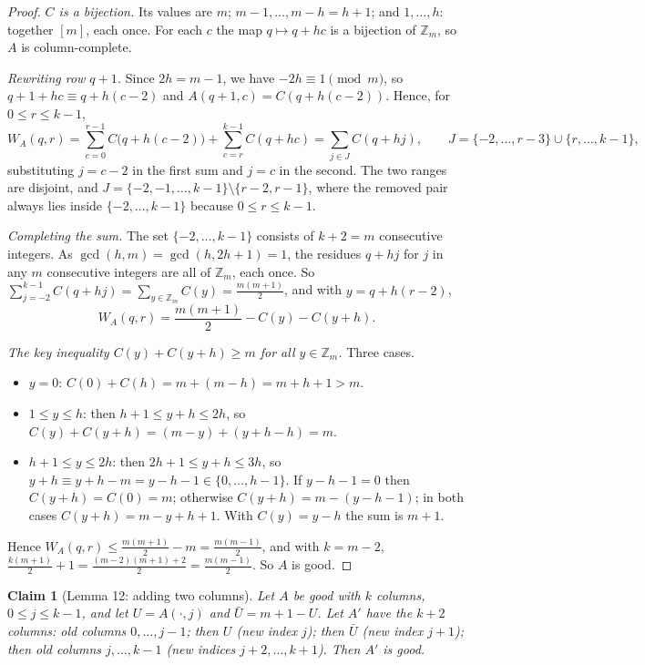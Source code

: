 \documentclass[11pt]{amsart}
\newtheorem{claim}{Claim}
\theoremstyle{remark}
\newcommand{\Z}{\mathbb{Z}}
\begin{document}
\begin{proof}
\emph{$C$ is a bijection.} Its values are $m$; $m-1,\dots,m-h=h+1$; and $1,\dots,h$: together $[m]$, each once.
For each $c$ the map $q\mapsto q+hc$ is a bijection of $\Z_m$, so $A$ is column-complete.

\emph{Rewriting row $q+1$.} Since $2h=m-1$, we have $-2h\equiv1\pmod m$, so $q+1+hc\equiv q+h(c-2)$ and
$A(q+1,c)=C(q+h(c-2))$. Hence, for $0\le r\le k-1$,
\[
W_A(q,r)=\sum_{c=0}^{r-1}C\bigl(q+h(c-2)\bigr)+\sum_{c=r}^{k-1}C(q+hc)=\sum_{j\in J}C(q+hj),\qquad
J=\{-2,\dots,r-3\}\cup\{r,\dots,k-1\},
\]
substituting $j=c-2$ in the first sum and $j=c$ in the second. The two ranges are disjoint, and
$J=\{-2,-1,\dots,k-1\}\setminus\{r-2,r-1\}$, where the removed pair always lies inside $\{-2,\dots,k-1\}$ because
$0\le r\le k-1$.

\emph{Completing the sum.} The set $\{-2,\dots,k-1\}$ consists of $k+2=m$ consecutive integers. As $\gcd(h,m)=
\gcd(h,2h+1)=1$, the residues $q+hj$ for $j$ in any $m$ consecutive integers are all of $\Z_m$, each once. So
$\sum_{j=-2}^{k-1}C(q+hj)=\sum_{y\in\Z_m}C(y)=\frac{m(m+1)}2$, and with $y=q+h(r-2)$,
\[
W_A(q,r)=\frac{m(m+1)}2-C(y)-C(y+h).
\]

\emph{The key inequality $C(y)+C(y+h)\ge m$ for all $y\in\Z_m$.} Three cases.
\begin{itemize}
\item $y=0$: $C(0)+C(h)=m+(m-h)=m+h+1>m$.
\item $1\le y\le h$: then $h+1\le y+h\le2h$, so $C(y)+C(y+h)=(m-y)+(y+h-h)=m$.
\item $h+1\le y\le2h$: then $2h+1\le y+h\le3h$, so $y+h\equiv y+h-m=y-h-1\in\{0,\dots,h-1\}$. If $y-h-1=0$ then
$C(y+h)=C(0)=m$; otherwise $C(y+h)=m-(y-h-1)$; in both cases $C(y+h)=m-y+h+1$. With $C(y)=y-h$ the sum is $m+1$.
\end{itemize}
Hence $W_A(q,r)\le\frac{m(m+1)}2-m=\frac{m(m-1)}2$, and with $k=m-2$,
$\frac{k(m+1)}2+1=\frac{(m-2)(m+1)+2}2=\frac{m(m-1)}2$. So $A$ is good.
\end{proof}

\begin{claim}[Lemma 12: adding two columns]
Let $A$ be good with $k$ columns, $0\le j\le k-1$, and let $U=A(\cdot,j)$ and $\bar U=m+1-U$. Let $A'$ have the
$k+2$ columns: old columns $0,\dots,j-1$; then $U$ (new index $j$); then $\bar U$ (new index $j+1$); then old columns
$j,\dots,k-1$ (new indices $j+2,\dots,k+1$). Then $A'$ is good.
\end{claim}
\end{document}
